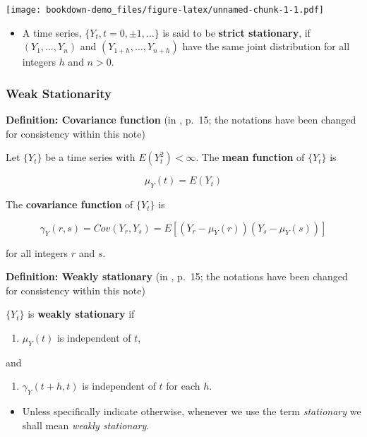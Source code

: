 \documentclass[]{book}
\providecommand{\tightlist}{%
  \setlength{\itemsep}{0pt}\setlength{\parskip}{0pt}}
\begin{document}
\texttt{[image: bookdown-demo\_files/figure-latex/unnamed-chunk-1-1.pdf]}

\begin{itemize}
\tightlist
\item
  A time series, \(\{Y_t, t=0, \pm1,\dots\}\) is said to be \textbf{strict stationary}, if \((Y_1, \dots, Y_n)\) and \((Y_{1+h}, \dots, Y_{n+h})\) have the same joint distribution for all integers \(h\) and \(n>0.\)
\end{itemize}

\hypertarget{weak-stationarity}{%
\subsubsection{Weak Stationarity}\label{weak-stationarity}}

\textbf{Definition: Covariance function} (in \citep{brockwell2016introduction}, p.~15; the notations have been changed for consistency within this note)

Let \(\{Y_t\}\) be a time series with \(E(Y_t^2)<\infty.\) The \textbf{mean function} of \(\{Y_t\}\) is

\[\mu_Y(t)= E(Y_t)\]

The \textbf{covariance function} of \(\{Y_t\}\) is

\[\gamma_Y(r,s)=Cov(Y_r, Y_s)=E[(Y_r-\mu_Y(r))(Y_s-\mu_Y(s))]\]

for all integers \(r\) and \(s\).

\textbf{Definition: Weakly stationary} (in \citep{brockwell2016introduction}, p.~15; the notations have been changed for consistency within this note)

\(\{Y_t\}\) is \textbf{weakly stationary} if

\begin{enumerate}
\def\labelenumi{\arabic{enumi}.}
\tightlist
\item
  \(\mu_Y(t)\) is independent of \(t\),
\end{enumerate}

and

\begin{enumerate}
\def\labelenumi{\arabic{enumi}.}
\setcounter{enumi}{1}
\tightlist
\item
  \(\gamma_Y(t+h,t)\) is independent of \(t\) for each \(h\).
\end{enumerate}

\begin{itemize}
\tightlist
\item
  Unless specifically indicate otherwise, whenever we use the term \emph{stationary} we shall mean \emph{weakly stationary}.
\end{itemize}
\end{document}
